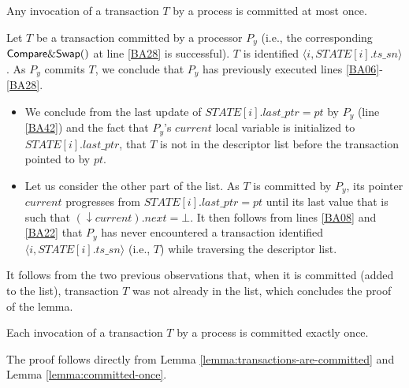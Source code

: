 \begin{lemma}
\label{lemma:committed-once}
Any invocation of a transaction $T$ by a process is  committed at most once.
\end{lemma}

\begin{proofL}
Let $T$ be a transaction committed by a processor $P_y$ (i.e., 
the corresponding ${\sf Compare\&Swap}()$ at line \ref{BA28} is successful). 
$T$ is identified $\langle  i, \mathit{STATE}[i].ts\_sn \rangle$.
As  $P_y$ commits  $T$,  we conclude that $P_y$ has previously 
executed lines \ref{BA06}-\ref{BA28}. 
\begin{itemize}
\item 
We conclude from  the last update of $\mathit{STATE}[i].last\_ptr=pt$ by $P_y$
(line \ref{BA42}) and  the fact that $P_y$'s $current$ local variable is 
initialized  to   $\mathit{STATE}[i].last\_ptr$,  that  $T$ is not in the 
descriptor list before the transaction pointed to by $pt$. 
\item 
Let us consider the other part of the list. 
As $T$ is committed by $P_y$, its pointer  $current$  progresses from 
 $\mathit{STATE}[i].last\_ptr=pt$ until its last value that is  such that
$(\downarrow current).next=\bot$.  It then follows from 
lines \ref{BA08} and  \ref{BA22} that  $P_y$ has never 
encountered a  transaction identified  
$\langle  i, \mathit{STATE}[i].ts\_sn \rangle$ (i.e., $T$) 
while traversing the descriptor list. 
\end{itemize}
It follows from the two previous observations  that, 
when it  is committed (added to  the list), transaction $T$ was not already
in the list, which concludes the proof of  the lemma. 
\renewcommand{\toto}{lemma:committed-once}
\end{proofL}

\begin{lemma}
\label{lemma:trans-code}
Each invocation of a transaction $T$ by a process  is committed exactly once.
\end{lemma}

\begin{proofL}
The proof follows directly from Lemma \ref{lemma:transactions-are-committed}
and Lemma \ref{lemma:committed-once}.
\renewcommand{\toto}{lemma:trans-code}
\end{proofL}




